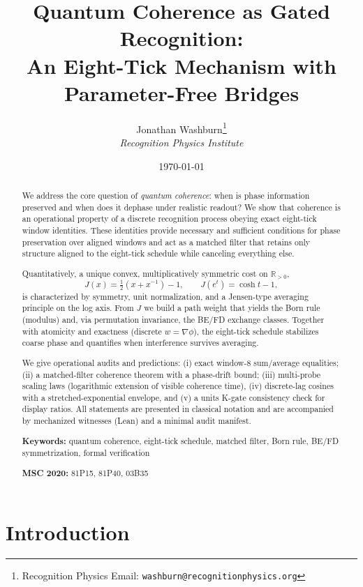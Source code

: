 \documentclass[12pt,a4paper]{article}
\title{Quantum Coherence as Gated Recognition: \\ 
An Eight-Tick Mechanism with Parameter-Free Bridges}
\author{Jonathan Washburn\thanks{Recognition Physics Email: \texttt{washburn@recognitionphysics.org}} \\
\textit{Recognition Physics Institute}}
\date{\today}
\theoremstyle{definition}
\theoremstyle{remark}
\begin{document}
\maketitle

\begin{abstract}
We address the core question of \emph{quantum coherence}: when is phase information preserved and when does it dephase under realistic readout? We show that coherence is an operational property of a discrete recognition process obeying exact eight-tick window identities. These identities provide necessary and sufficient conditions for phase preservation over aligned windows and act as a matched filter that retains only structure aligned to the eight-tick schedule while canceling everything else.

Quantitatively, a unique convex, multiplicatively symmetric cost on $\mathbb{R}_{>0}$,
\begin{equation}
J(x) = \tfrac{1}{2}(x + x^{-1}) - 1,\qquad J(e^t)=\cosh t - 1,
\end{equation}
is characterized by symmetry, unit normalization, and a Jensen-type averaging principle on the log axis. From $J$ we build a path weight that yields the Born rule (modulus) and, via permutation invariance, the BE/FD exchange classes. Together with atomicity and exactness (discrete $w=\nabla\phi$), the eight-tick schedule stabilizes coarse phase and quantifies when interference survives averaging.

We give operational audits and predictions: (i) exact window-8 sum/average equalities; (ii) a matched-filter coherence theorem with a phase-drift bound; (iii) multi-probe scaling laws (logarithmic extension of visible coherence time), (iv) discrete-lag cosines with a stretched-exponential envelope, and (v) a units K-gate consistency check for display ratios. All statements are presented in classical notation and are accompanied by mechanized witnesses (Lean) and a minimal audit manifest.

\noindent\textbf{Keywords:} quantum coherence, eight-tick schedule, matched filter, Born rule, BE/FD symmetrization, formal verification

\noindent\textbf{MSC 2020:} 81P15, 81P40, 03B35
\end{abstract}

\section{Introduction}
\end{document}
